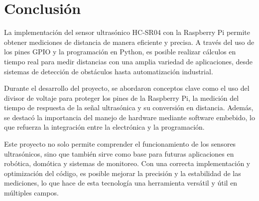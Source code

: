 \section{Conclusión}

La implementación del sensor ultrasónico HC-SR04 con la Raspberry Pi permite obtener mediciones de distancia de manera eficiente y precisa. A través del uso de los pines GPIO y la programación en Python, es posible realizar cálculos en tiempo real para medir distancias con una amplia variedad de aplicaciones, desde sistemas de detección de obstáculos hasta automatización industrial.

Durante el desarrollo del proyecto, se abordaron conceptos clave como el uso del divisor de voltaje para proteger los pines de la Raspberry Pi, la medición del tiempo de respuesta de la señal ultrasónica y su conversión en distancia. Además, se destacó la importancia del manejo de hardware mediante software embebido, lo que refuerza la integración entre la electrónica y la programación.

Este proyecto no solo permite comprender el funcionamiento de los sensores ultrasónicos, sino que también sirve como base para futuras aplicaciones en robótica, domótica y sistemas de monitoreo. Con una correcta implementación y optimización del código, es posible mejorar la precisión y la estabilidad de las mediciones, lo que hace de esta tecnología una herramienta versátil y útil en múltiples campos.

